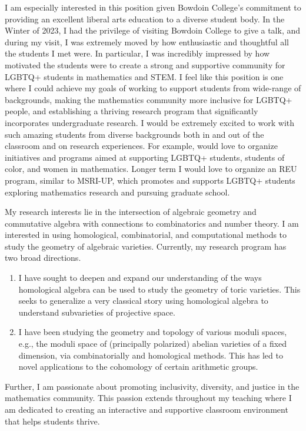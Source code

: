 \documentclass[11pt]{article}
\begin{document}
I am especially interested in this position given Bowdoin College's commitment to providing an excellent liberal arts education to a diverse student body. In the Winter of 2023, I had the privilege of visiting Bowdoin College to give a talk, and during my visit, I was extremely moved by how enthusiastic and thoughtful all the students I met were. In particular, I was incredibly impressed by how motivated the students were to create a strong and supportive community for LGBTQ+ students in mathematics and STEM. I feel like this position is one where I could achieve my goals of working to support students from wide-range of backgrounds, making the mathematics community more inclusive for LGBTQ+ people, and establishing a thriving research program that significantly incorporates undergraduate research. I would be extremely excited to work with such amazing students from diverse backgrounds both in and out of the classroom and on research experiences. For example, would love to organize initiatives and programs aimed at supporting LGBTQ+ students, students of color, and women in mathematics. Longer term I would love to organize an REU program, similar to  MSRI-UP, which promotes and supports LGBTQ+ students exploring mathematics research and pursuing graduate school. 

My research interests lie in the intersection of algebraic geometry and commutative algebra with connections to combinatorics and number theory. I am interested in using homological, combinatorial, and computational methods to study the geometry of algebraic varieties. Currently, my research program has two broad directions.
\begin{enumerate}[leftmargin=*,label=(\roman*)]
\item I have sought to deepen and expand our understanding of the ways homological algebra can be used to study the geometry of toric varieties. This seeks to generalize a very classical story using homological algebra to understand subvarieties of projective space.
\item I have been studying the geometry and topology of various moduli spaces, e.g., the moduli space of (principally polarized) abelian varieties of a fixed dimension, via combinatorially and homological methods. This has led to novel applications to the cohomology of certain arithmetic groups. 
\end{enumerate}
Further, I am passionate about promoting inclusivity, diversity, and justice in the mathematics community. This passion extends throughout my teaching where I am dedicated to creating an interactive and supportive classroom environment that helps students thrive. 
\end{document}
